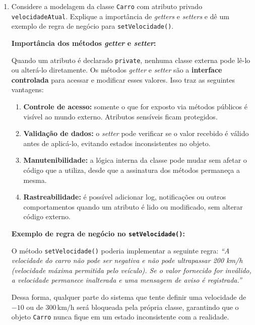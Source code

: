 \documentclass[12pt,a4paper]{article}
\begin{document}
\begin{enumerate}
\begin{tcolorbox}[respostabox]
Portanto, uma classe filha em \textbf{qualquer pacote} pode acessar \texttt{v} diretamente por herança.

\textbf{Atenção:} A alternativa A está incompleta (omite as subclasses de outros pacotes). A alternativa E descreve \texttt{public}. A alternativa B descreve \texttt{private}.
\end{tcolorbox}

\vspace{0.4cm}

\item Considere a modelagem da classe \texttt{Carro} com atributo privado \texttt{velocidadeAtual}. Explique a importância de \textit{getters} e \textit{setters} e dê um exemplo de regra de negócio para \texttt{setVelocidade()}.

\begin{tcolorbox}[respostabox]
\textbf{Importância dos métodos \textit{getter} e \textit{setter}:}

Quando um atributo é declarado \texttt{private}, nenhuma classe externa pode lê-lo ou alterá-lo diretamente. Os métodos \textit{getter} e \textit{setter} são a \textbf{interface controlada} para acessar e modificar esses valores. Isso traz as seguintes vantagens:

\begin{enumerate}
    \item \textbf{Controle de acesso:} somente o que for exposto via métodos públicos é visível ao mundo externo. Atributos sensíveis ficam protegidos.
    \item \textbf{Validação de dados:} o \textit{setter} pode verificar se o valor recebido é válido antes de aplicá-lo, evitando estados inconsistentes no objeto.
    \item \textbf{Manutenibilidade:} a lógica interna da classe pode mudar sem afetar o código que a utiliza, desde que a assinatura dos métodos permaneça a mesma.
    \item \textbf{Rastreabilidade:} é possível adicionar log, notificações ou outros comportamentos quando um atributo é lido ou modificado, sem alterar código externo.
\end{enumerate}

\textbf{Exemplo de regra de negócio no \texttt{setVelocidade()}:}

O método \texttt{setVelocidade()} poderia implementar a seguinte regra: \textit{``A velocidade do carro não pode ser negativa e não pode ultrapassar 200 km/h (velocidade máxima permitida pelo veículo). Se o valor fornecido for inválido, a velocidade permanece inalterada e uma mensagem de aviso é registrada.''}

Dessa forma, qualquer parte do sistema que tente definir uma velocidade de $-10$ ou de $300\,\text{km/h}$ será bloqueada pela própria classe, garantindo que o objeto \texttt{Carro} nunca fique em um estado inconsistente com a realidade.
\end{tcolorbox}

\end{enumerate}

\vspace{0.8cm}
\end{document}
